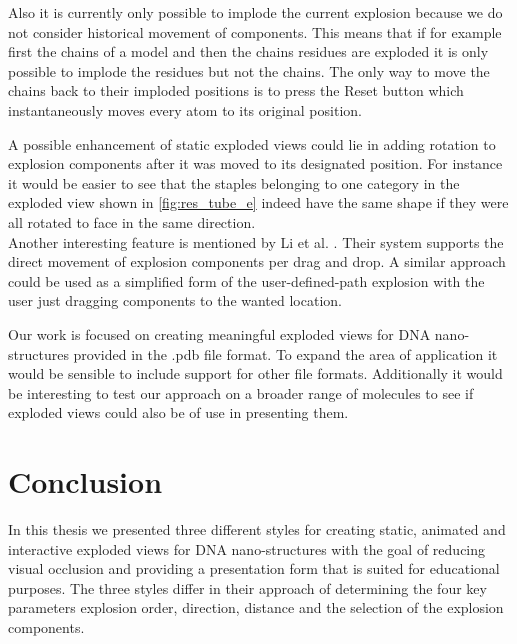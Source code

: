 \documentclass[draft,final]{vutinfth} %
\begin{document}
\par Also it is currently only possible to implode the current explosion because we do not consider historical movement of components. This means that if for example first the chains of a model and then the chains residues are exploded it is only possible to implode the residues but not the chains. The only way to move the chains back to their imploded positions is to press the Reset button which instantaneously moves every atom to its original position.

\par A possible enhancement of static exploded views could lie in adding rotation to explosion components after it was moved to its designated position. For instance it would be easier to see that the staples belonging to one category in the exploded view shown in \autoref{fig:res_tube_e} indeed have the same shape if they were all rotated to face in the same direction.
\\ Another interesting feature is mentioned by Li et al. \cite{li2008automated}. Their system supports the direct movement of explosion components per drag and drop. A similar approach could be used as a simplified form of the user-defined-path explosion with the user just dragging components to the wanted location.

\par Our work is focused on creating meaningful exploded views for DNA nano-structures provided in the .pdb file format. To expand the area of application it would be sensible to include support for other file formats. Additionally it would be interesting to test our approach on a broader range of molecules to see if exploded views could also be of use in presenting them.


\chapter{Conclusion}
\label{chap:summary}
In this thesis we presented three different styles for creating static, animated and interactive exploded views for DNA nano-structures with the goal of reducing visual occlusion and providing a presentation form that is suited for educational purposes. The three styles differ in their approach of determining the four key parameters explosion order, direction, distance and the selection of the explosion components.
\end{document}
